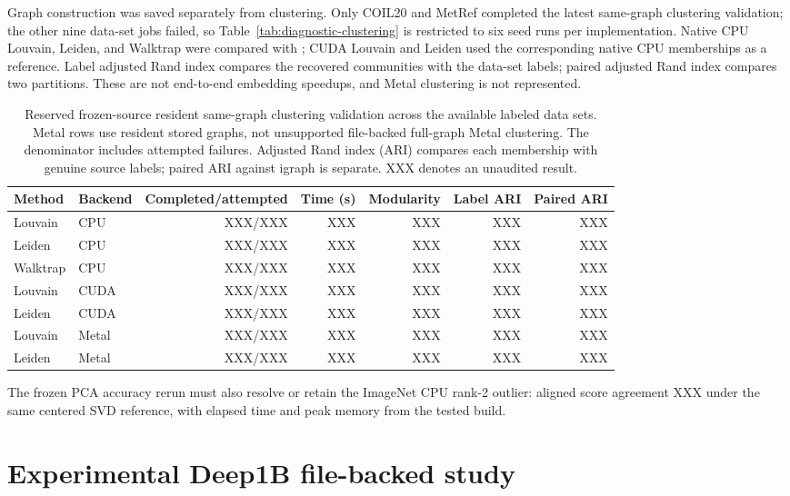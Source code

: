 \documentclass[article]{jss}
\begin{document}
Graph construction was saved separately from clustering. Only COIL20
and MetRef completed the latest same-graph clustering validation; the
other nine data-set jobs failed, so Table~\ref{tab:diagnostic-clustering}
is restricted to six seed runs per implementation. Native CPU Louvain,
Leiden, and Walktrap were compared with ; CUDA Louvain and
Leiden used the corresponding native CPU memberships as a reference.
Label adjusted Rand index compares the recovered communities with the
data-set labels; paired adjusted Rand index compares two partitions.
These are not end-to-end embedding speedups, and Metal clustering is
not represented.



\begin{table}[htbp]
\centering
\scriptsize
\caption{Reserved frozen-source resident same-graph clustering validation
  across the available labeled data sets. Metal rows use resident stored
  graphs, not unsupported file-backed full-graph Metal clustering.
  The denominator includes attempted
  failures. Adjusted Rand index (ARI) compares each membership with
  genuine source labels; paired ARI against igraph is separate.
  XXX denotes an unaudited result.}
\label{tab:pending-clustering}
\begin{tabular}{llrrrrr}
\toprule
Method & Backend & Completed/attempted & Time (s) & Modularity &
  Label ARI & Paired ARI \\
\midrule
Louvain & CPU & XXX/XXX & XXX & XXX & XXX & XXX \\
Leiden & CPU & XXX/XXX & XXX & XXX & XXX & XXX \\
Walktrap & CPU & XXX/XXX & XXX & XXX & XXX & XXX \\
Louvain & CUDA & XXX/XXX & XXX & XXX & XXX & XXX \\
Leiden & CUDA & XXX/XXX & XXX & XXX & XXX & XXX \\
Louvain & Metal & XXX/XXX & XXX & XXX & XXX & XXX \\
Leiden & Metal & XXX/XXX & XXX & XXX & XXX & XXX \\
\bottomrule
\end{tabular}
\end{table}

The frozen PCA accuracy rerun must also resolve or retain the ImageNet
CPU rank-2 outlier: aligned score agreement XXX under the same centered
SVD reference, with elapsed time and peak memory from the tested build.

\section{Experimental Deep1B file-backed study}
\end{document}
